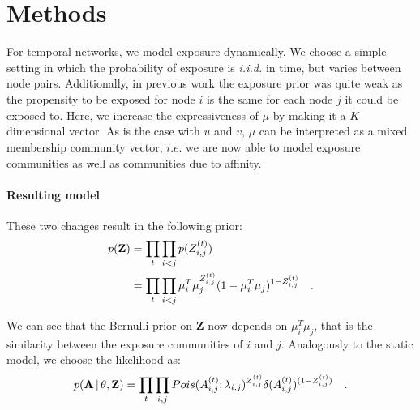 \section{Methods}
For temporal networks, we model exposure dynamically. 
We choose a simple setting in which the probability of exposure is \textit{i.i.d.} in time, but varies 
between node pairs. 
Additionally, in previous work the exposure prior was quite weak as the propensity to be exposed for node $i$ is the same for each node $j$
it could be exposed to. Here, we increase the expressiveness of $\mu$ by making it a $\tilde{K}$-dimensional vector. 
As is the case with $u$ and $v$, $\mu$ can be interpreted as a mixed membership community vector, $\textit{i.e.}$
we are now able to model exposure communities as well as communities due to affinity.\\

\paragraph{Resulting model}
These two changes result in the following prior: 
\begin{equation}\label{eqn:expMarkov}
    \begin{aligned}
        p(\textbf{Z}) &= \prod_t \prod_{i<j} p(Z_{i,j}^{(t)}) \\
                      &= \prod_t \prod_{i<j} \mu_i^T \mu_j^{Z_{i,j}^{(t)}} (1-\mu_i^T \mu_j)^{1-Z_{i,j}^{(t)}}\quad.
    \end{aligned}      
\end{equation}

We can see that the Bernulli prior on \textbf{Z} now depends on $\mu_i^T \mu_j$, that is the similarity between the exposure communities
of $i$ and $j$. 
Analogously to the static model, we choose the likelihood as:
\begin{equation}
    \begin{aligned}
        p(\textbf{A} \,|\, \theta, \textbf{Z}) = \prod_t \prod_{i,j} Pois(A_{i,j}^{(t)} ; \lambda_{i,j})^{Z_{i,j}^{(t)}} \delta(A_{i,j}^{(t)})^{(1-Z_{i,j}^{(t)})}\quad.
    \end{aligned}      
\end{equation}
